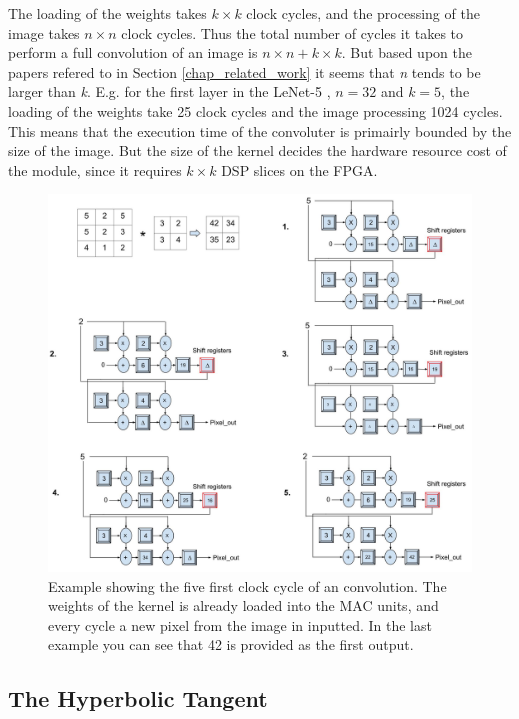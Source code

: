 The loading of the weights takes $ k \times k $ clock cycles, and the processing of the image takes $ n \times n $ clock cycles. Thus the total number of cycles it takes to perform a full convolution of an image is $ n \times n + k \times k $. But based upon the papers refered to in Section \ref{chap_related_work} it seems that \textit{n} tends to be larger than \textit{k}. E.g. for the first layer in the LeNet-5 \cite{LeCun1998}, $ n = 32 $ and $ k = 5 $, the loading  of the weights take 25 clock cycles and the image processing 1024 cycles. This means that the execution time of the convoluter is primairly bounded by the size of the image. But the size of the kernel decides the hardware resource cost of the module, since it requires $ k \times k $ DSP slices on the FPGA.

\begin{figure}[h!]
  \centering
      \includegraphics[width=1.1\textwidth]{Figures/Method/Conv_example}
  \caption[Convolution example]{Example showing the five first clock cycle of an convolution. The weights of the kernel is already loaded into the MAC units, and every cycle a new pixel from the image in inputted. In the last example you can see that 42 is provided as the first output.}
\end{figure}


\subsection{The Hyperbolic Tangent} 

